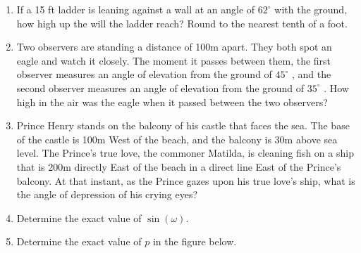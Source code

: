 \begin{enumerate}
\begin{enumerate}
  \end{enumerate}

\item If a 15 ft ladder is leaning against a wall at an angle of
  $62^\circ$ with the ground, how high up the will the ladder reach?
  Round to the nearest tenth of a foot.


\item Two observers are standing a distance of 100m apart. They both
  spot an eagle and watch it closely. The moment it passes between
  them, the first observer measures an angle of elevation from the
  ground of $45^\circ$ , and the second observer measures an angle of
  elevation from the ground of $35^\circ$ . How high in the air was
  the eagle when it passed between the two observers?

\item Prince Henry stands on the balcony of his castle that faces the
  sea. The base of the castle is 100m West of the beach, and the
  balcony is 30m above sea level. The Prince's true love, the commoner
  Matilda, is cleaning fish on a ship that is 200m directly East of
  the beach in a direct line East of the Prince's balcony. At that
  instant, as the Prince gazes upon his true love's ship, what is the
  angle of depression of his crying eyes?

\item Determine the exact value of $\sin(\omega)$.
  

\item Determine the exact value of $p$ in the figure below.




\end{enumerate}
